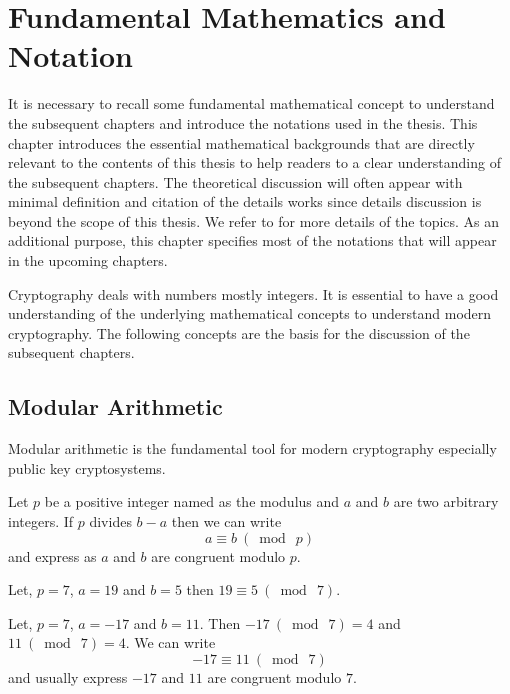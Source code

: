 \chapter{Fundamental Mathematics and Notation}
\label{chap:fundamentals} 
It is necessary to recall some fundamental mathematical concept to understand the subsequent chapters and introduce the notations used in the thesis.
This chapter introduces the essential mathematical backgrounds that are directly relevant to the contents of this thesis to help readers to a clear understanding of the subsequent chapters.
The theoretical discussion will often appear with minimal definition and citation of the details works since details discussion is beyond the scope of this thesis.
We refer to \cite{lidl_niederreiter_1996, book_HFFMullen2013, book_CMSSmart2015, book_GPCMrabet2016, book_CSCBlahut} for more details of the topics. 
As an additional purpose, this chapter specifies most of the notations that will appear in the upcoming chapters.

Cryptography deals with numbers mostly integers.
It is essential to have a good understanding of the underlying mathematical concepts to understand modern cryptography.
The following concepts are the basis for the discussion of the subsequent chapters.

\section{Modular Arithmetic}
\label{sec:chap:fund:modular_arithm} 
 Modular arithmetic is the fundamental tool for modern cryptography especially public key cryptosystems.
\begin{definition}
	Let  $p$ be a positive integer named as the modulus  and  $a$ and $b$  are two arbitrary integers. 
	If  $p$ divides $b-a$  then we can write
	 $$ a \equiv b ~(\bmod ~p)$$
	 and express as $a$ and $b$ are congruent modulo $p$.
\end{definition}
\begin{example}
	Let, $p =7$, $a=19$ and $b=5$ then 
	$19  \equiv  5 ~(\bmod ~7) $.
\end{example}

\begin{example}
	Let, $p =7$, $a=-17$  and $b=11$. Then $-17  ~(\bmod ~7)  = 4$ and $11 ~(\bmod ~7) = 4$. 
	We can write 
	$$-17  \equiv  11 ~(\bmod ~7) $$ 
	and usually express $-17$ and $11$ are congruent modulo $7$.
\end{example}

